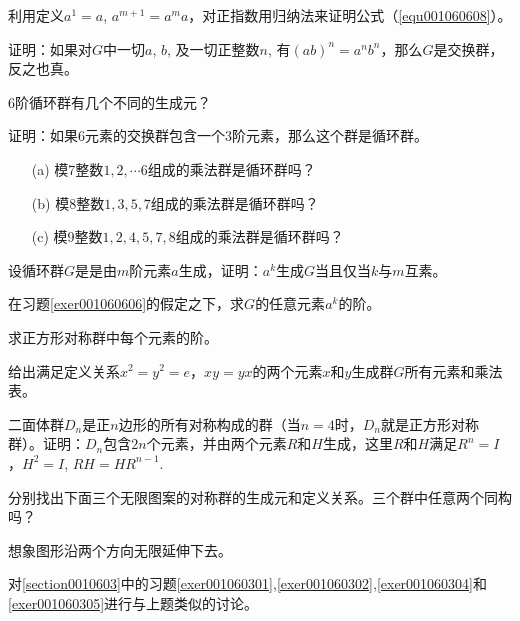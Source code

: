 \begin{problemset}
\item 利用定义$a^1=a$, $a^{m+1}=a^ma$，对正指数用归纳法来证明公式（\ref{equ001060608}）。

\item\label{exer001060602} 证明：如果对$G$中一切$a$, $b$, 及一切正整数$n$, 有$(ab)^n=a^nb^n$，那么$G$是交换群，反之也真。

\item 6阶循环群有几个不同的生成元？

\item 证明：如果6元素的交换群包含一个3阶元素，那么这个群是循环群。

\item 
\begin{enumerate}
\item[(a)] 模7整数$1,2,\cdots 6$组成的乘法群是循环群吗？
\item[(b)] 模8整数$1,3,5,7$组成的乘法群是循环群吗？
\item[(c)] 模9整数$1,2,4,5,7,8$组成的乘法群是循环群吗？ 
\end{enumerate}

\item\label{exer001060606} 设循环群$G$是是由$m$阶元素$a$生成，证明：$a^k$生成$G$当且仅当$k$与$m$互素。

\item 在习题\ref{exer001060606}的假定之下，求$G$的任意元素$a^k$的阶。

\item 求正方形对称群中每个元素的阶。

\item 给出满足定义关系$x^2=y^2=e$，$xy=yx$的两个元素$x$和$y$生成群$G$所有元素和乘法表。

\item 二面体群$D_n$是正$n$边形的所有对称构成的群（当$n=4$时，$D_n$就是正方形对称群）。证明：$D_n$包含$2n$个元素，并由两个元素$R$和$H$生成，这里$R$和$H$满足$R^n=I$，$H^2=I$, $RH=HR^{n-1}$.

\item 分别找出下面三个无限图案的对称群的生成元和定义关系。三个群中任意两个同构吗？

想象图形沿两个方向无限延伸下去。

\item 对\ref{section0010603}中的习题\ref{exer001060301},\ref{exer001060302},\ref{exer001060304}和\ref{exer001060305}进行与上题类似的讨论。
\end{problemset}



